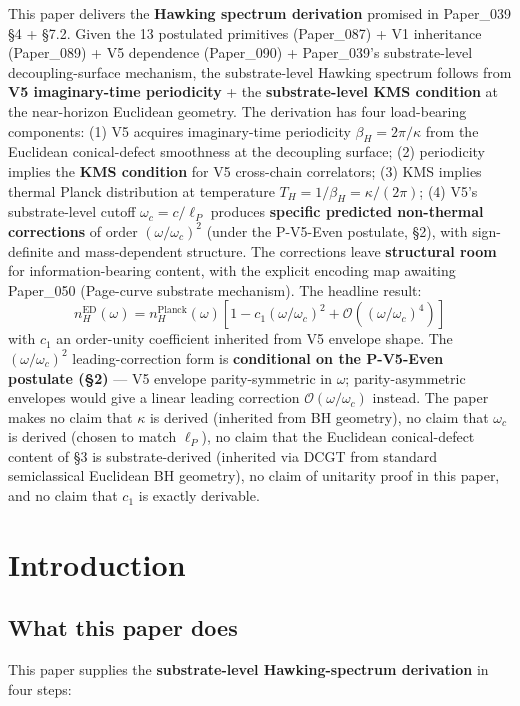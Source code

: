 \documentclass[11pt,a4paper]{article}
\begin{document}
This paper delivers the \textbf{Hawking spectrum derivation} promised in Paper\_039 \S4 + \S7.2. Given the 13 postulated primitives (Paper\_087) + V1 inheritance (Paper\_089) + V5 dependence (Paper\_090) + Paper\_039's substrate-level decoupling-surface mechanism, the substrate-level Hawking spectrum follows from \textbf{V5 imaginary-time periodicity} + the \textbf{substrate-level KMS condition} at the near-horizon Euclidean geometry. The derivation has four load-bearing components: (1) V5 acquires imaginary-time periodicity $\beta_H = 2\pi/\kappa$ from the Euclidean conical-defect smoothness at the decoupling surface; (2) periodicity implies the \textbf{KMS condition} for V5 cross-chain correlators; (3) KMS implies thermal Planck distribution at temperature $T_H = 1/\beta_H = \kappa/(2\pi)$; (4) V5's substrate-level cutoff $\omega_c = c/\ell_P$ produces \textbf{specific predicted non-thermal corrections} of order $(\omega/\omega_c)^2$ (under the P-V5-Even postulate, \S2), with sign-definite and mass-dependent structure. The corrections leave \textbf{structural room} for information-bearing content, with the explicit encoding map awaiting Paper\_050 (Page-curve substrate mechanism). The headline result:
\[
n_H^\mathrm{ED}(\omega) = n_H^\mathrm{Planck}(\omega)\left[1 - c_1(\omega/\omega_c)^2 + \mathcal{O}((\omega/\omega_c)^4)\right]
\]
with $c_1$ an order-unity coefficient inherited from V5 envelope shape. The $(\omega/\omega_c)^2$ leading-correction form is \textbf{conditional on the P-V5-Even postulate (\S2)} --- V5 envelope parity-symmetric in $\omega$; parity-asymmetric envelopes would give a linear leading correction $\mathcal{O}(\omega/\omega_c)$ instead. The paper makes no claim that $\kappa$ is derived (inherited from BH geometry), no claim that $\omega_c$ is derived (chosen to match $\ell_P$), no claim that the Euclidean conical-defect content of \S3 is substrate-derived (inherited via DCGT from standard semiclassical Euclidean BH geometry), no claim of unitarity proof in this paper, and no claim that $c_1$ is exactly derivable.

\section{Introduction}

\subsection{What this paper does}

This paper supplies the \textbf{substrate-level Hawking-spectrum derivation} in four steps:
\end{document}
